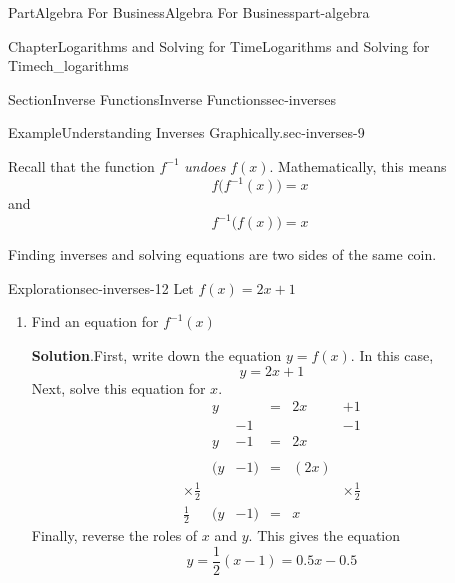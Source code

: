 \documentclass{tufte-book}
\newcommand{\blocktitlefont}{\relax}
\numberwithin{equation}{chapter}
\newcommand{\amp}{&}
\begin{document}
\begin{partptx}{Part}{Algebra For Business}{}{Algebra For Business}{}{}{part-algebra}
\begin{chapterptx}{Chapter}{Logarithms and Solving for Time}{}{Logarithms and Solving for Time}{}{}{ch_logarithms}
\begin{sectionptx}{Section}{Inverse Functions}{}{Inverse Functions}{}{}{sec-inverses}
\begin{example}{Example}{Understanding Inverses Graphically.}{sec-inverses-9}
\begin{image}{0}{1}{0}{}
{
}%
\end{image}%
\end{example}
Recall that the function \(f^{-1}\) \emph{undoes} \(f(x)\). Mathematically, this means%
\begin{equation*}
f\Big( f^{-1}(x) \Big) = x
\end{equation*}
and%
\begin{equation*}
f^{-1}\Big( f(x) \Big) = x
\end{equation*}
%
\par
Finding inverses and solving equations are two sides of the same coin.%
\begin{exploration}{Exploration}{}{sec-inverses-12}%
Let \(f(x) = 2x+1\)%
\begin{enumerate}[font=\bfseries,label=(\alph*),ref=\alph*]%
\item{}Find an equation for \(f^{-1}(x)\)%
\par\smallskip%
\noindent\textbf{\blocktitlefont Solution}.\hypertarget{sec-inverses-12-2-2}{}\quad{}First, write down the equation \(y=f(x)\).  In this case,%
\begin{equation*}
y = 2x + 1
\end{equation*}
Next, solve this equation for \(x\).%
\begin{align*}
\amp y \amp \amp= \amp 2x \amp + 1 \\
\amp   \amp -1 \amp \amp \amp -1 \\
\amp y \amp -1 \amp= \amp 2x \amp  \\
\amp  \amp  \amp  \amp  \amp \\
\amp (y \amp -1)\amp= \amp (2x) \amp  \\
\times\frac{1}{2} \amp   \amp \amp \amp \amp \times\frac{1}{2} \\
\frac{1}{2}\amp (y \amp -1)\amp= \amp x \amp  
\end{align*}
Finally, reverse the roles of \(x\) and \(y\).  This gives the equation%
\begin{equation*}
y = \frac{1}{2} ( x - 1) = 0.5 x -0.5
\end{equation*}

\end{enumerate}
\end{exploration}
\end{sectionptx}
\end{chapterptx}
\end{partptx}
\end{document}
